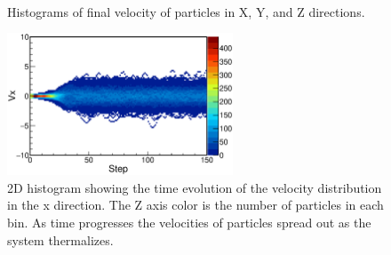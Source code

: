 \documentclass[singlepage,notitlepage,nofootinbib,11pt]{revtex4-1}
\begin{document}
\begin{figure}[]
  \captionsetup[subfigure]{labelformat=empty}
  \centering
  \\
 \hfill
  \caption{\label{fig8} Histograms of final velocity of particles in X, Y, and Z directions.}
\end{figure}
\begin{figure}[]
  \centering
\includegraphics[width=0.6\textwidth]{figures/vx_step.eps}
\hfill
\caption{\label{fig9} 2D histogram showing the time evolution of the velocity distribution in the x direction. The Z axis color is the number of particles in each bin. As time progresses the velocities of particles spread out as the system thermalizes.}
\end{figure}
\end{document}
